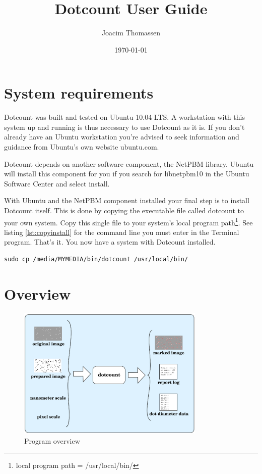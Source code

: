 \documentclass[a4paper,10pt]{book}
\begin{document}
\title{Dotcount User Guide}
\date{\today}
\author{Joacim Thomassen}

\maketitle



\chapter{System requirements}
\label{chap:requirements}
Dotcount was built and tested on Ubuntu 10.04 LTS. A workstation with this
system up and running is thus necessary to use Dotcount as it is. If you don't
already have an Ubuntu workstation you're advised to seek information and
guidance from Ubuntu's own website ubuntu.com.

Dotcount depends on another software component, the NetPBM library. Ubuntu will
install this component for you if you search for libnetpbm10 in the Ubuntu
Software Center and select install. 

With Ubuntu and the NetPBM component installed your final step is to install
Dotcount itself. This is done by copying the executable file called dotcount to
your own system. Copy this single file to your system's local program
path\footnote{local program path = /usr/local/bin/}. See listing
\ref{lst:copyinstall} for the command line you must enter in the Terminal
program. That's it. You now have a system with Dotcount installed.

\begin{lstlisting}[caption={Install program with copy command. Replace
MYMEDIA with the name given to your media containing dotcount.},
label=lst:copyinstall]
sudo cp /media/MYMEDIA/bin/dotcount /usr/local/bin/
\end{lstlisting}


\chapter{Overview}
\label{chap:overview}

\begin{figure}[htb]
  \centering
  \includegraphics[width=0.8\textwidth]{dotcountoverview}
  \caption{Program overview}
  \label{fig:progoverview}
\end{figure}
\end{document}
